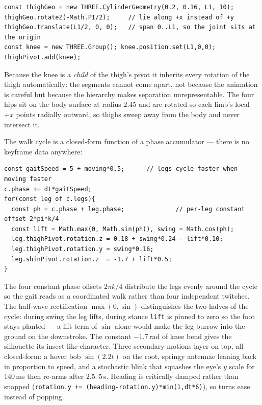\documentclass[10pt,a4paper]{article}
\newcommand{\code}[1]{\texttt{\small #1}}
\begin{document}
\begin{lstlisting}
const thighGeo = new THREE.CylinderGeometry(0.2, 0.16, L1, 10);
thighGeo.rotateZ(-Math.PI/2);     // lie along +x instead of +y
thighGeo.translate(L1/2, 0, 0);   // span 0..L1, so the joint sits at the origin
const knee = new THREE.Group(); knee.position.set(L1,0,0); thighPivot.add(knee);
\end{lstlisting}

\noindent Because the knee is a \emph{child} of the thigh's pivot it inherits every rotation of the thigh
automatically: the segments cannot come apart, not because the animation is careful but because the
hierarchy makes separation unrepresentable. The four hips sit on the body surface at radius $2.45$ and are
rotated so each limb's local $+x$ points radially outward, so thighs sweep away from the body and never
intersect it.

The walk cycle is a closed-form function of a phase accumulator --- there is no keyframe data anywhere:

\begin{lstlisting}
const gaitSpeed = 5 + moving*0.5;      // legs cycle faster when moving faster
c.phase += dt*gaitSpeed;
for(const leg of c.legs){
  const ph = c.phase + leg.phase;              // per-leg constant offset 2*pi*k/4
  const lift = Math.max(0, Math.sin(ph)), swing = Math.cos(ph);
  leg.thighPivot.rotation.z = 0.18 + swing*0.24 - lift*0.10;
  leg.thighPivot.rotation.y = swing*0.16;
  leg.shinPivot.rotation.z  = -1.7 + lift*0.5;
}
\end{lstlisting}

\noindent The four constant phase offsets $2\pi k/4$ distribute the legs evenly around the cycle so the
gait reads as a coordinated walk rather than four independent twitches. The half-wave rectification
$\max(0,\sin)$ distinguishes the two halves of the cycle: during swing the leg lifts, during stance
\code{lift} is pinned to zero so the foot stays planted --- a lift term of $\sin$ alone would make the leg
burrow into the ground on the downstroke. The constant $-1.7$\,rad of knee bend gives the silhouette its
insect-like character. Three secondary motions layer on top, all closed-form: a hover bob $\sin(2.2t)$ on
the root, springy antennae leaning back in proportion to speed, and a stochastic blink that squashes the
eye's $y$ scale for 140\,ms then re-arms after $2.5$--$5$\,s. Heading is critically damped rather than
snapped (\code{rotation.y += (heading-rotation.y)*min(1,dt*6)}), so turns ease instead of popping.
\end{document}
